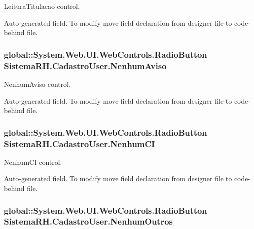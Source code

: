 LeituraTitulacao control. 

Auto-\/generated field. To modify move field declaration from designer file to code-\/behind file. \hypertarget{class_sistema_r_h_1_1_cadastro_user_ab52561cadeaba4e91a2bff50eaa10944}{
\subsubsection[{NenhumAviso}]{\setlength{\rightskip}{0pt plus 5cm}global::System.Web.UI.WebControls.RadioButton {\bf SistemaRH.CadastroUser.NenhumAviso}}}
\label{class_sistema_r_h_1_1_cadastro_user_ab52561cadeaba4e91a2bff50eaa10944}


NenhumAviso control. 

Auto-\/generated field. To modify move field declaration from designer file to code-\/behind file. \hypertarget{class_sistema_r_h_1_1_cadastro_user_ae4b7e53f819b4ebb952f046dc38e9b55}{
\subsubsection[{NenhumCI}]{\setlength{\rightskip}{0pt plus 5cm}global::System.Web.UI.WebControls.RadioButton {\bf SistemaRH.CadastroUser.NenhumCI}}}
\label{class_sistema_r_h_1_1_cadastro_user_ae4b7e53f819b4ebb952f046dc38e9b55}


NenhumCI control. 

Auto-\/generated field. To modify move field declaration from designer file to code-\/behind file. \hypertarget{class_sistema_r_h_1_1_cadastro_user_a0071562337337028175da44e079fef63}{
\subsubsection[{NenhumOutros}]{\setlength{\rightskip}{0pt plus 5cm}global::System.Web.UI.WebControls.RadioButton {\bf SistemaRH.CadastroUser.NenhumOutros}}}
\label{class_sistema_r_h_1_1_cadastro_user_a0071562337337028175da44e079fef63}


